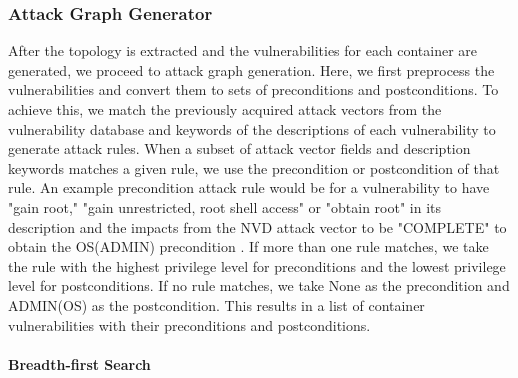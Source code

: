 \subsubsection{Attack Graph Generator}
\label{chap:attack_graph_p}

After the topology is extracted and the vulnerabilities for each container are generated, we proceed to attack graph generation. Here, we first preprocess the vulnerabilities and convert them to sets of preconditions and postconditions. To achieve this, we match the previously acquired attack vectors from the vulnerability database and keywords of the descriptions of each vulnerability to generate attack rules. When a subset of attack vector fields and description keywords matches a given rule, we use the precondition or postcondition of that rule. An example precondition attack rule would be for a vulnerability to have "gain root," "gain unrestricted, root shell access" or "obtain root" in its description and the impacts from the NVD attack vector \cite{booth2013national} to be "COMPLETE" to obtain the OS(ADMIN) precondition \cite{aksu2018automated}. If more than one rule matches, we take the rule with the highest privilege level for preconditions and the lowest privilege level for postconditions. If no rule matches, we take None as the precondition and ADMIN(OS) as the postcondition. This results in a list of container vulnerabilities with their preconditions and postconditions.

\paragraph{Breadth-first Search}
\label{chap:bfs}

